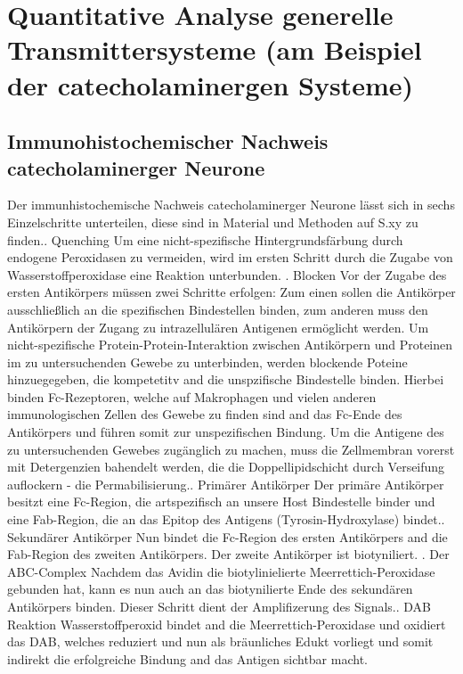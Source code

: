 \documentclass[12pt,a4paper,pdftex]{article}
\begin{document}
\section{Quantitative Analyse generelle Transmittersysteme (am Beispiel der catecholaminergen Systeme)}
\subsection{Immunohistochemischer Nachweis catecholaminerger Neurone}
Der immunhistochemische Nachweis catecholaminerger Neurone lässt sich in sechs Einzelschritte unterteilen, diese sind in Material und Methoden auf S.xy zu finden.. Quenching\newline
Um eine nicht-spezifische Hintergrundsfärbung durch endogene Peroxidasen zu vermeiden, wird im ersten Schritt durch die Zugabe von Wasserstoffperoxidase eine Reaktion unterbunden. . Blocken\newline
Vor der Zugabe des ersten Antikörpers müssen zwei Schritte erfolgen: Zum einen sollen die Antikörper ausschließlich an die spezifischen Bindestellen binden, zum anderen muss den Antikörpern der Zugang zu intrazellulären Antigenen ermöglicht werden.
Um nicht-spezifische Protein-Protein-Interaktion zwischen Antikörpern und Proteinen im zu untersuchenden Gewebe zu unterbinden, werden blockende Poteine hinzuegegeben, die kompetetitv and die unspzifische Bindestelle binden. Hierbei binden Fc-Rezeptoren, welche auf Makrophagen und vielen anderen immunologischen Zellen des Gewebe zu finden sind and das Fc-Ende des Antikörpers und führen somit zur unspezifischen Bindung. 
Um die Antigene des zu untersuchenden Gewebes zugänglich zu machen, muss die Zellmembran vorerst mit Detergenzien bahendelt werden, die die Doppellipidschicht durch Verseifung auflockern - die Permabilisierung.. Primärer Antikörper\newline
Der primäre Antikörper besitzt eine Fc-Region, die artspezifisch an unsere Host Bindestelle binder und eine Fab-Region, die an das Epitop des Antigens (Tyrosin-Hydroxylase) bindet.. Sekundärer Antikörper\newline
Nun bindet die Fc-Region des ersten Antikörpers and die Fab-Region des zweiten Antikörpers. Der zweite Antikörper ist biotyniliert. . Der ABC-Complex\newline
Nachdem das Avidin die biotylinielierte Meerrettich-Peroxidase gebunden hat, kann es nun auch an das biotynilierte Ende des sekundären Antikörpers binden. Dieser Schritt dient der Amplifizerung des Signals.. DAB Reaktion\newline
Wasserstoffperoxid bindet and die Meerrettich-Peroxidase und oxidiert das DAB, welches reduziert und nun als bräunliches Edukt vorliegt und somit indirekt die erfolgreiche Bindung and das Antigen sichtbar macht.\newline
\end{document}
